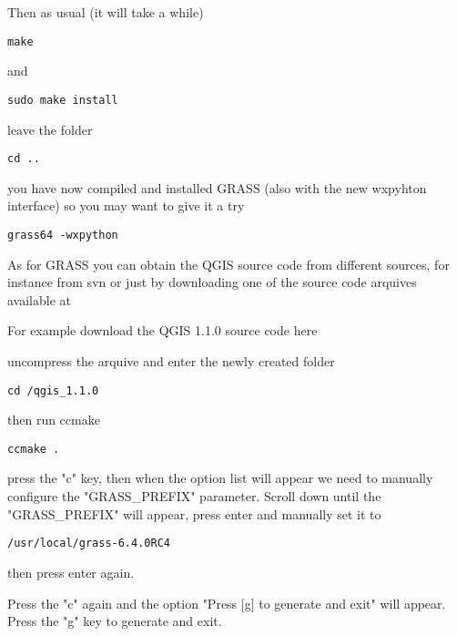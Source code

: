 Then as usual (it will take a while)

\begin{verbatim}
make
\end{verbatim}

and

\begin{verbatim}
sudo make install
\end{verbatim}

leave the folder 

\begin{verbatim}
cd ..
\end{verbatim}

you have now compiled and installed GRASS (also with the new wxpyhton interface) so you
may want to give it a try

\begin{verbatim}
grass64 -wxpython
\end{verbatim}

As for GRASS you can obtain the QGIS source code from different sources,
for instance from svn or just by downloading one of the source code arquives available
at 

For example download the QGIS 1.1.0 source code here 

uncompress the arquive and enter the newly created folder

\begin{verbatim}
cd /qgis_1.1.0
\end{verbatim}

then run ccmake

\begin{verbatim}
ccmake .
\end{verbatim}

press the "c" key, then when the option list will appear we need to manually
configure the "GRASS\_PREFIX" parameter. Scroll down until the "GRASS\_PREFIX" will appear, 
press enter and manually set it to

\begin{verbatim}
/usr/local/grass-6.4.0RC4
\end{verbatim}

then press enter again.

Press the "c" again and the option "Press [g] to generate and exit" will appear.
Press the "g" key to generate and exit.

